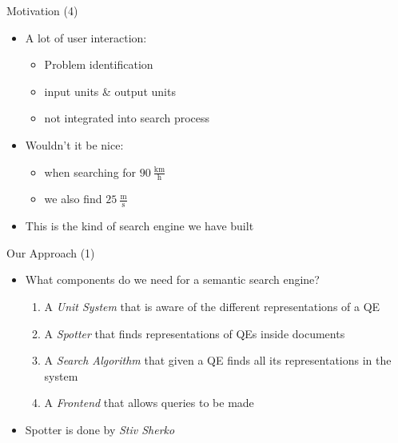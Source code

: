 \documentclass{beamer}
\begin{document}
  \begin{frame}{Motivation (4)}
    \begin{itemize}[<+->]
      \item A lot of user interaction:
      \begin{itemize}
        \item Problem identification
        \item input units \& output units
        \item not integrated into search process
      \end{itemize}

      \item Wouldn't it be nice:
      \begin{itemize}[<+->]
        \item when searching for $90\ \frac{\text{km}}{\text{h}}$
        \item we also find $25\ \frac{\text{m}}{\text{s}}$
      \end{itemize}

      \item This is the kind of search engine we have built
    \end{itemize}
  \end{frame}

  \begin{frame}{Our Approach (1)}
    \begin{itemize}[<+->]
      \item What components do we need for a semantic search engine?

      \begin{enumerate}[<+->]
        \item A \textit{Unit System} that is aware of the different representations of a QE
        \item A \textit{Spotter} that finds representations of QEs inside documents
        \item A \textit{Search Algorithm} that given a QE finds all its representations in the system
        \item A \textit{Frontend} that allows queries to be made
      \end{enumerate}

      \item Spotter is done by \textit{Stiv Sherko}
    \end{itemize}
  \end{frame}
\end{document}
